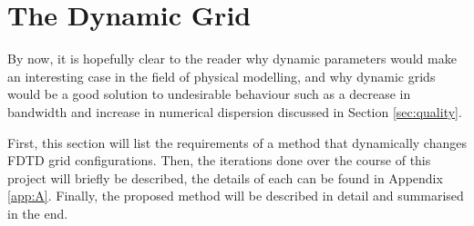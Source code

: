 \section{The Dynamic Grid}
By now, it is hopefully clear to the reader why dynamic parameters would make an interesting case in the field of physical modelling, and why dynamic grids would be a good solution to undesirable behaviour such as a decrease in bandwidth and increase in numerical dispersion discussed in Section \ref{sec:quality}. %

First, this section will list the requirements of a method that dynamically changes FDTD grid configurations. Then, the iterations done over the course of this project will briefly be described, the details of each can be found in Appendix \ref{app:A}.  Finally, the proposed method will be described in detail and summarised in the end.

